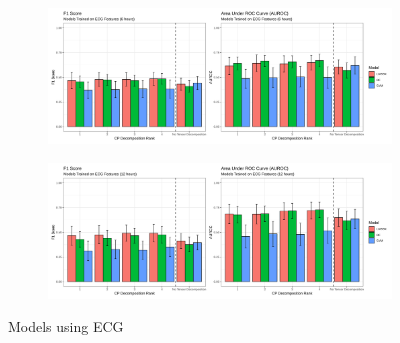\begin{figure}[htb]
    \centering
    \begin{subfigure}[htb]{0.49\textwidth}
        \includegraphics[width=\textwidth]{body/figures/ecg_6.svg}
    \end{subfigure}
    \hfill
    \begin{subfigure}[htb]{0.49\textwidth}
        \includegraphics[width=\textwidth]{body/figures/ecg_12.svg}
    \end{subfigure}
    \caption{Models using ECG}
    \label{fig:rf_ecgonly}
\end{figure}  %

